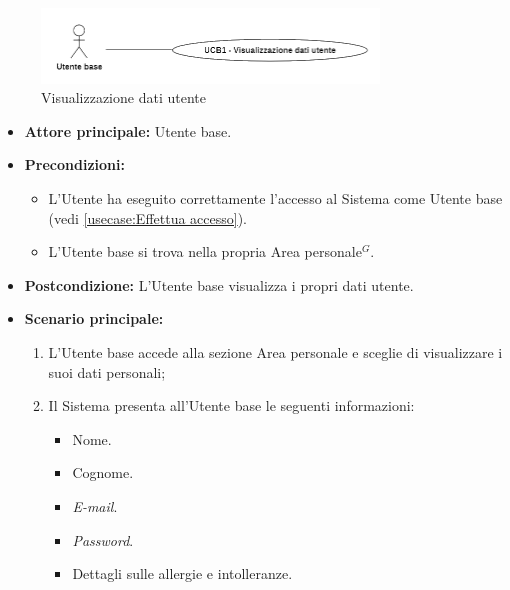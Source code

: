 \newpage
{}
\label{usecase:Visualizzazione dati utente}

\begin{figure}[h]
	\centering
	\includegraphics[width=0.8\textwidth]{./uml/UCB1.png} 
	\caption{Visualizzazione dati utente}
	\label{fig:UCB1}
  \end{figure}


\begin{itemize}
	\item \textbf{Attore principale:} Utente base.

	\item \textbf{Precondizioni:}
	      \begin{itemize}
		      \item L'Utente ha eseguito correttamente l'accesso al Sistema come
		            Utente base (vedi \autoref{usecase:Effettua accesso}).
		      \item L'Utente base si trova nella propria Area personale$^G$.
	      \end{itemize}

	\item \textbf{Postcondizione:} L'Utente base visualizza i propri dati utente.

	\item \textbf{Scenario principale:}
	      \begin{enumerate}
		      \item L'Utente base accede alla sezione Area personale e sceglie di visualizzare i suoi dati personali;
		      \item Il Sistema presenta all'Utente base le seguenti informazioni:
		            \begin{itemize}
			            \item Nome.
			            \item Cognome.
			            \item \textit{E-mail}.
			            \item \textit{Password}.
			            \item Dettagli sulle allergie e intolleranze.
		            \end{itemize}
	      \end{enumerate}
\end{itemize}
